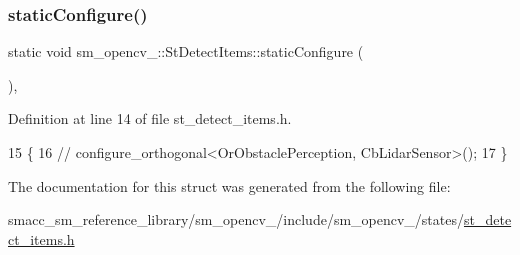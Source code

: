 \subsubsection{\texorpdfstring{static\+Configure()}{staticConfigure()}}
{\footnotesize\ttfamily static void sm\+\_\+opencv\+\_\+::\+St\+Detect\+Items\+::static\+Configure (\begin{DoxyParamCaption}{ }\end{DoxyParamCaption})\hspace{0.3cm}{\ttfamily [inline]}, {\ttfamily [static]}}



Definition at line 14 of file st\+\_\+detect\+\_\+items.\+h.


\begin{DoxyCode}
15   \{
16     \textcolor{comment}{//   configure\_orthogonal<OrObstaclePerception, CbLidarSensor>();}
17   \}
\end{DoxyCode}


The documentation for this struct was generated from the following file\+:\begin{DoxyCompactItemize}
\item 
smacc\+\_\+sm\+\_\+reference\+\_\+library/sm\+\_\+opencv\+\_/include/sm\+\_\+opencv\+\_/states/\hyperlink{2_2include_2sm__opencv__2_2states_2st__detect__items_8h}{st\+\_\+detect\+\_\+items.\+h}\end{DoxyCompactItemize}
